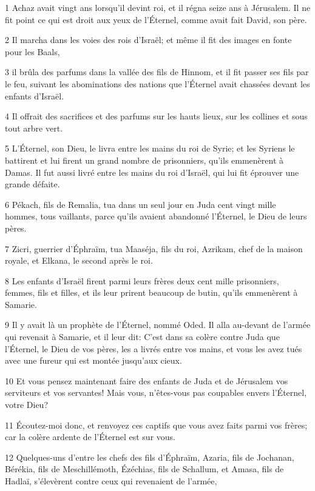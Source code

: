 \par 1 Achaz avait vingt ans lorsqu'il devint roi, et il régna seize ans à Jérusalem. Il ne fit point ce qui est droit aux yeux de l'Éternel, comme avait fait David, son père.
\par 2 Il marcha dans les voies des rois d'Israël; et même il fit des images en fonte pour les Baals,
\par 3 il brûla des parfums dans la vallée des fils de Hinnom, et il fit passer ses fils par le feu, suivant les abominations des nations que l'Éternel avait chassées devant les enfants d'Israël.
\par 4 Il offrait des sacrifices et des parfums sur les hauts lieux, sur les collines et sous tout arbre vert.
\par 5 L'Éternel, son Dieu, le livra entre les mains du roi de Syrie; et les Syriens le battirent et lui firent un grand nombre de prisonniers, qu'ils emmenèrent à Damas. Il fut aussi livré entre les mains du roi d'Israël, qui lui fit éprouver une grande défaite.
\par 6 Pékach, fils de Remalia, tua dans un seul jour en Juda cent vingt mille hommes, tous vaillants, parce qu'ils avaient abandonné l'Éternel, le Dieu de leurs pères.
\par 7 Zicri, guerrier d'Éphraïm, tua Maaséja, fils du roi, Azrikam, chef de la maison royale, et Elkana, le second après le roi.
\par 8 Les enfants d'Israël firent parmi leurs frères deux cent mille prisonniers, femmes, fils et filles, et ils leur prirent beaucoup de butin, qu'ils emmenèrent à Samarie.
\par 9 Il y avait là un prophète de l'Éternel, nommé Oded. Il alla au-devant de l'armée qui revenait à Samarie, et il leur dit: C'est dans sa colère contre Juda que l'Éternel, le Dieu de vos pères, les a livrés entre vos mains, et vous les avez tués avec une fureur qui est montée jusqu'aux cieux.
\par 10 Et vous pensez maintenant faire des enfants de Juda et de Jérusalem vos serviteurs et vos servantes! Mais vous, n'êtes-vous pas coupables envers l'Éternel, votre Dieu?
\par 11 Écoutez-moi donc, et renvoyez ces captifs que vous avez faits parmi vos frères; car la colère ardente de l'Éternel est sur vous.
\par 12 Quelques-uns d'entre les chefs des fils d'Éphraïm, Azaria, fils de Jochanan, Bérékia, fils de Meschillémoth, Ézéchias, fils de Schallum, et Amasa, fils de Hadlaï, s'élevèrent contre ceux qui revenaient de l'armée,

